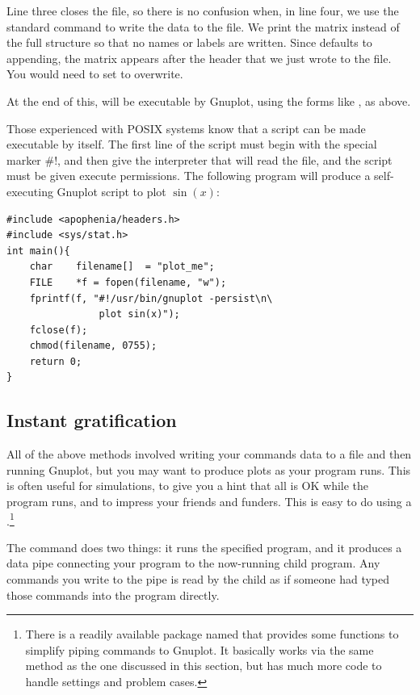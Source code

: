 Line three closes the file, so there is no confusion when, in line four,
we use the standard  command to write the data
to the file. We print the matrix instead of the
full  structure so that no names or labels are written.
Since  defaults to appending, the matrix appears
after the  header that we just wrote to the file.
You would need to set  to overwrite.

At the end of this,  will be executable by
Gnuplot, using the forms like 
, as above.

\treesymbol{} Those experienced with POSIX systems know that a script
can be made executable by itself. The first line of the script must begin
with the special marker \#!, and then give the interpreter that will read
the file, and the script must be given execute permissions. The following
program will produce a self-executing Gnuplot script to plot $\sin(x)$:
\begin{lstlisting}
#include <apophenia/headers.h>
#include <sys/stat.h>
int main(){
    char    filename[]  = "plot_me";
    FILE    *f = fopen(filename, "w");
    fprintf(f, "#!/usr/bin/gnuplot -persist\n\
                plot sin(x)");
    fclose(f);
    chmod(filename, 0755);
    return 0;
}
\end{lstlisting}

\subsection{\treesymbol Instant gratification} 
All of the above methods involved writing your commands data to a file and then 
running Gnuplot, but you may want to produce plots as your program runs.
This is often useful for simulations, to give you a hint that all is OK
while the program runs, and to impress your friends and funders. This is
easy to do using a \vocab{pipe}.\footnote{There is a readily available
package named \cind{gnuplot\_i} that provides some functions to simplify
piping commands to Gnuplot. It basically works via the same method as
the one discussed in this section, but has much more code to handle
settings and problem cases.}

The command  does two things: it runs the specified program,
and it produces a data pipe connecting your program to the now-running
child program. Any commands you write to the pipe is read by the child
as if someone had typed those commands into the program directly.

